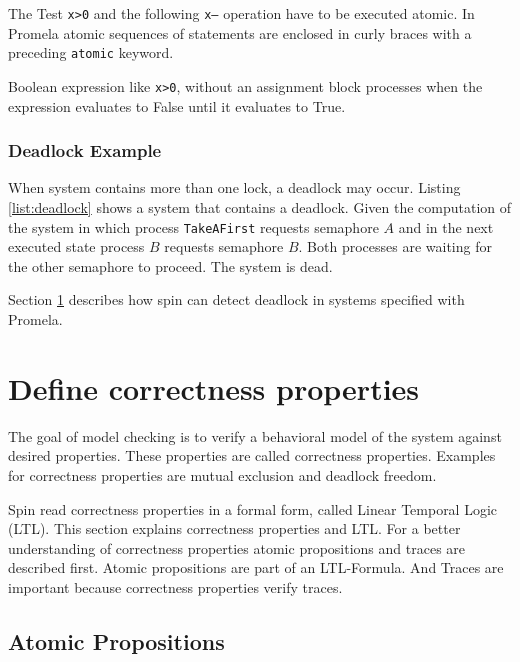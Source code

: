 \documentclass[12pt,a4paper,twoside]{article}
\begin{document}
The Test \texttt{x>0} and the following \texttt{x--} operation have to be executed atomic. In Promela atomic sequences of statements are enclosed in curly braces with a preceding \texttt{atomic} keyword.

Boolean expression like \verb|x>0|, without an assignment block processes when the expression evaluates to False until it evaluates to True.

\subsubsection{Deadlock Example}
\label{sec:deadlock}

When system contains more than one lock, a deadlock may occur. Listing \ref{list:deadlock} shows a system that contains a deadlock. Given the computation of the system in which process \texttt{TakeAFirst} requests semaphore $A$ and in the next executed state process $B$ requests semaphore $B$. Both processes are waiting for the other semaphore to proceed. The system is dead.



Section \ref{sec:ltl} describes how spin can detect deadlock in systems specified with Promela.

\section{Define correctness properties}
\label{sec:ltl}

The goal of model checking is to verify a behavioral model of the system against desired properties. These properties are called correctness properties. Examples for correctness properties are mutual exclusion and deadlock freedom. 

Spin read correctness properties in a formal form, called Linear Temporal Logic (LTL). This section explains correctness properties and LTL. For a better understanding of correctness properties atomic propositions and traces are described first. Atomic propositions are part of an LTL-Formula. And Traces are important because correctness properties verify traces.

\subsection{Atomic Propositions}
\label{sec:atomicpropositions}
\end{document}
